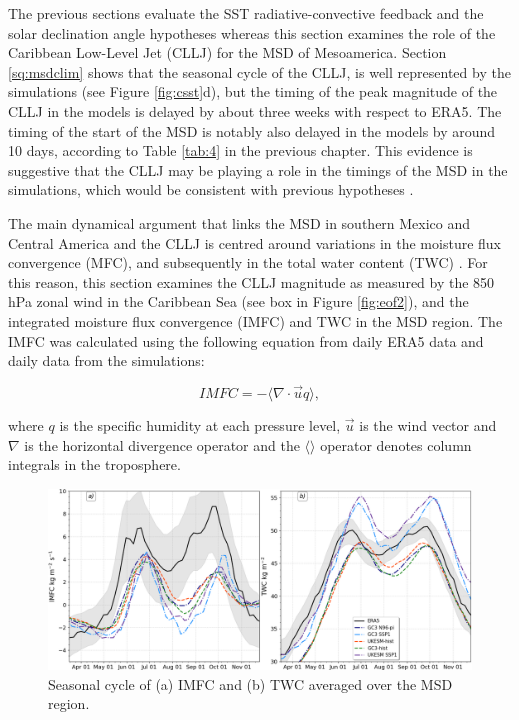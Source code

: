 The previous sections evaluate the SST radiative-convective feedback and the solar declination angle hypotheses whereas this section examines the role of the Caribbean Low-Level Jet (CLLJ) for the MSD of Mesoamerica. Section \ref{sq:msdclim} shows that the seasonal cycle of the CLLJ, is well represented by the simulations (see Figure \ref{fig:csst}d), but the timing of the peak magnitude of the CLLJ in the models is delayed by about three weeks with respect to ERA5. The timing of the start of the MSD is notably also delayed in the models by around 10 days, according to Table \ref{tab:4} in the previous chapter. This evidence is suggestive that the CLLJ may be playing a role in the timings of the MSD in the simulations, which would be consistent with previous hypotheses \citep[e.g.][]{herrera2015,martinez2019}.

The main dynamical argument that links the MSD in southern Mexico and Central America and the CLLJ is centred around variations in the moisture flux convergence (MFC), and subsequently in the total water content (TWC) \citep[see e.g.][]{gamble2008,herrera2015,martinez2019,zermeno2019}. For this reason, this section examines the CLLJ magnitude as measured by the 850 hPa zonal wind in the Caribbean Sea (see box in Figure \ref{fig:eof2}), and the integrated moisture flux convergence (IMFC) and TWC in the MSD region.
The IMFC was calculated using the following equation from daily ERA5 data and daily data from the simulations:

\begin{equation}
IMFC=-\Bigg\langle \nabla \cdot \vec{u}q \Bigg \rangle,
\label{eq:waterbudget}
\end{equation}

\noindent where $q$ is the specific humidity at each pressure level, $\vec{u}$ is the wind vector and $\nabla$ is the horizontal divergence operator and the $\langle \rangle$ operator denotes column integrals in the troposphere.

 \begin{figure}[t!]
\includegraphics[width=\linewidth]{figures/imfd_index_seasonal}
\caption[Seasonal cycle of IMFC and TWC]{Seasonal cycle of (a) IMFC and (b) TWC averaged over the MSD region.}
\label{fig:imfd_cycle}
\end{figure}

